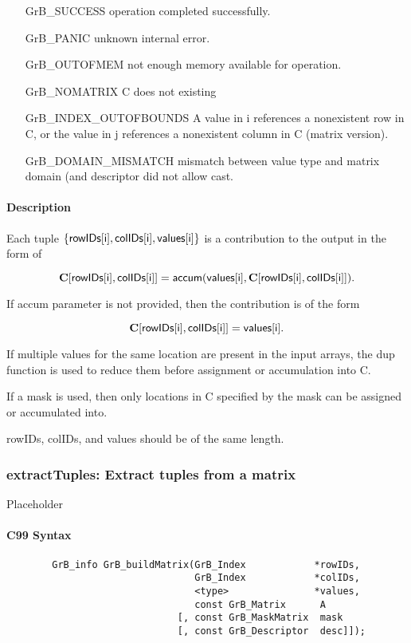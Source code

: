\begin{itemize}[leftmargin=2.1in]
\item[{\sf GrB\_SUCCESS}] 	operation completed successfully.
\item[{\sf GrB\_PANIC}]	    unknown internal error.
\item[{\sf GrB\_OUTOFMEM}]	not enough memory available for operation.
\item[{\sf GrB\_NOMATRIX}]  C does not existing
\item[{\sf GrB\_INDEX\_OUTOFBOUNDS}]
        A value in i references a nonexistent row in C, or
	    the value in j references a nonexistent column in C (matrix version).
\item[\sf GrB\_DOMAIN\_MISMATCH]  
	   mismatch between value type and matrix domain (and descriptor did not allow cast.
\end{itemize}


\paragraph{Description}
Each tuple $\{ {\sf rowIDs[i]}, {\sf colIDs[i]}, {\sf values[i]}\}$ is a contribution to the output in the form of 

$${\bf C}[{\sf rowIDs[i]},{\sf colIDs[i]}] = {\sf accum}({\sf values[i]}, {\bf C}[{\sf rowIDs[i]}, {\sf colIDs[i]}]).$$

If {\sf accum} parameter is not provided, then the contribution is of the form 

$${\bf C}[{\sf rowIDs[i]}, {\sf colIDs[i]}] = {\sf values[i]}.$$

If multiple values for the same location are present in the input arrays, the 
dup function is used to reduce them before assignment or accumulation into {\sf C}.

If a mask is used, then only locations in {\sf C} specified by the mask can be assigned or
accumulated into.
 
{\sf rowIDs}, {\sf colIDs}, and {\sf values} should be of the same length. 


\subsubsection{{\sf extractTuples}: Extract tuples from a matrix}

Placeholder


\paragraph{C99 Syntax}

\begin{verbatim}
        GrB_info GrB_buildMatrix(GrB_Index            *rowIDs,
                                 GrB_Index            *colIDs,
                                 <type>               *values, 
                                 const GrB_Matrix      A
                              [, const GrB_MaskMatrix  mask
                              [, const GrB_Descriptor  desc]]);
\end{verbatim}
